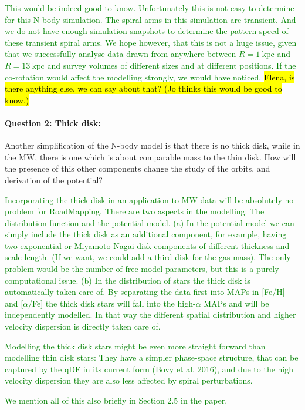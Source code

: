 \documentclass[10pt,a4paper]{article}
\newcommand{\Answer}[1]{\textcolor{Green}{#1}}
\begin{document}
\Answer{This would be indeed good to know. Unfortunately this is not easy to determine for this N-body simulation. The spiral arms in this simulation are transient. And we do not have enough simulation snapshots to determine the pattern speed of these transient spiral arms. We hope however, that this is not a huge issue, given that we successfully analyse data drawn from anywhere between $R=1~\text{kpc}$ and $R=13~\text{kpc}$ and survey volumes of different sizes and at different positions. If the co-rotation would affect the modelling strongly, we would have noticed.} \hl{Elena, is there anything else, we can say about that? (Jo thinks this would be good to know.)}

\paragraph{Question 2: Thick disk:} Another simplification of the N-body model is that there is no thick disk, while in
the MW, there is one which is about comparable mass to the thin disk. How will the
presence of this other components change the study of the orbits, and derivation of
the potential?

\Answer{Incorporating the thick disk in an application to MW data will be absolutely no problem for RoadMapping. There are two aspects in the modelling: The distribution function and the potential model. (a) In the potential model we can simply include the thick disk as an additional component, for example, having two exponential or Miyamoto-Nagai disk components of different thickness and scale length. (If we want, we could add a third disk for the gas mass). The only problem would be the number of free model parameters, but this is a purely computational issue. (b) In the distribution of stars the thick disk is automatically taken care of. By separating the data first into MAPs in [Fe/H] and [$\alpha$/Fe] the thick disk stars will fall into the high-$\alpha$ MAPs and will be independently modelled. In that way the different spatial distribution and higher velocity dispersion is directly taken care of.}

\Answer{Modelling the thick disk stars might be even more straight forward than modelling thin disk stars: They have a simpler phase-space structure, that can be captured by the qDF in its current form (Bovy et al. 2016), and due to the high velocity dispersion they are also less affected by spiral perturbations.}

\Answer{We mention all of this also briefly in Section 2.5 in the paper.}
\end{document}
